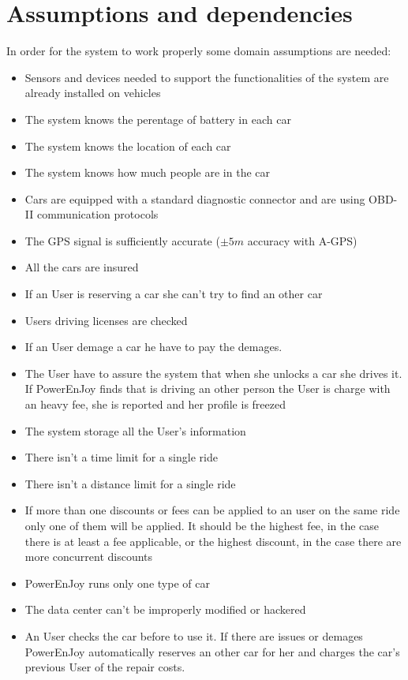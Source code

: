\section{Assumptions and dependencies}
In order for the system to work properly some domain assumptions are needed:%
\begin{itemize}
	\item{Sensors and devices needed to support the functionalities of the system are already installed on vehicles}
	\item{The system knows the perentage of battery in each car}
	\item{The system knows the location of each car}
	\item{The system knows how much people are in the car}
	\item{Cars are equipped with a standard diagnostic connector and are using OBD-II communication protocols}
	\item{The GPS signal is sufficiently accurate ($\pm5m$ accuracy with A-GPS)}
	\item{All the cars are insured}
	\item{If an User is reserving a car she can't try to find an other car}
	\item{Users driving licenses are checked}
	\item{If an User demage a car he have to pay the demages.}
	\item {The User have to assure the system that when she unlocks a car she drives it. If PowerEnJoy finds that is driving an other person the User is charge with an heavy fee, she is reported and her profile is freezed}
	\item{The system storage all the User's information}
	\item{There isn't a time limit for a single ride}%
	\item{There isn't a distance limit for a single ride}%
	\item{If more than one discounts or fees can be applied to an user on the same ride only one of them will be applied. It should be the highest fee, in the case there is at least a fee applicable, or the highest discount, in the case there are more concurrent discounts}
	\item{PowerEnJoy runs only one type of car}
	\item{The data center can't be improperly modified or hackered}
	\item{An User checks the car before to use it. If there are issues or demages PowerEnJoy automatically reserves an other car for her and charges the car's previous User of the repair costs.}

\end{itemize}
